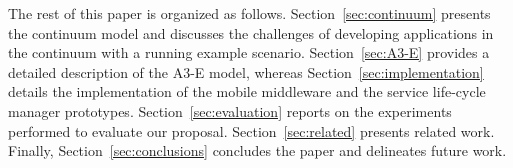 The rest of this paper is organized as follows. Section~\ref{sec:continuum} presents the continuum model and discusses the challenges of developing applications in the continuum with a running example scenario. Section~\ref{sec:A3-E} provides a detailed description of the A3-E model, whereas Section~\ref{sec:implementation} details the implementation of the mobile middleware and the service life-cycle manager prototypes. Section~\ref{sec:evaluation} reports on the experiments performed to evaluate our proposal. Section~\ref{sec:related} presents related work. Finally, Section~\ref{sec:conclusions} concludes the paper and delineates future work.

